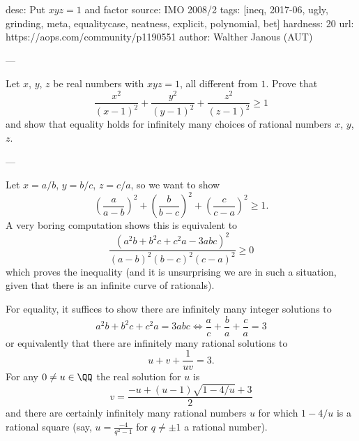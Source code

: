 desc: Put $xyz=1$ and factor
source: IMO 2008/2
tags: [ineq, 2017-06, ugly, grinding, meta, equalitycase, neatness, explicit, polynomial, bet]
hardness: 20
url: https://aops.com/community/p1190551
author: Walther Janous (AUT)

---

Let $x$, $y$, $z$ be real numbers with $xyz = 1$,
all different from $1$.
Prove that
\[ \frac{x^2}{(x-1)^2} + \frac{y^2}{(y-1)^2}
+ \frac{z^2}{(z-1)^2} \ge 1 \]
and show that equality holds for infinitely many choices
of rational numbers $x$, $y$, $z$.

---

Let $x=a/b$, $y=b/c$, $z=c/a$, so we want to show
\[ \left(\frac{a}{a-b}\right)^2+\left(\frac{b}{b-c}\right)^2
  +\left(\frac{c}{c-a}\right)^2\ge 1.\]
A very boring computation shows this is equivalent to
\[ \frac{(a^2b+b^2c+c^2a-3abc)^2}%
  {(a-b)^2(b-c)^2(c-a)^2}\ge 0\]
which proves the inequality
(and it is unsurprising we are in such a situation,
given that there is an infinite curve of rationals).

For equality, it suffices to show there are infinitely
many integer solutions to
\[ a^2b+b^2c+c^2a=3abc
  \iff \frac ac + \frac ba + \frac ca = 3
\]
or equivalently that
there are infinitely many rational solutions to
\[ u + v + \frac{1}{uv} = 3. \]
For any $0 \neq u \in \QQ$ the real solution for $u$ is
\[ v = \frac{-u + (u-1)\sqrt{1-4/u} + 3}{2} \]
and there are certainly infinitely many rational numbers $u$
for which $1-4/u$ is a rational square
(say, $u = \frac{-4}{q^2-1}$ for $q \neq \pm 1$ a rational number).
